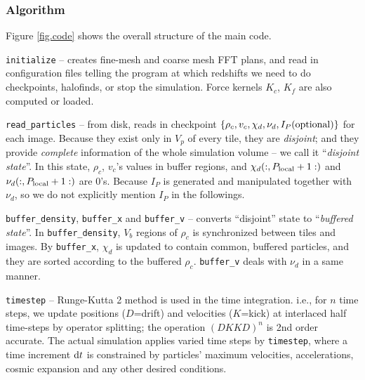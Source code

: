 \documentclass[10pt,twocolumn,preprint]{emulateapj}
\begin{document}
\subsubsection{Algorithm}\label{sss.algorithm}
Figure \ref{fig.code} shows the overall structure of the main code.

{\tt initialize} -- creates fine-mesh and coarse mesh FFT plans, and read in configuration files telling the program at which redshifts we need to do checkpoints, halofinds, or stop the simulation. Force kernels $K_c$, $K_f$ are also computed or loaded.

{\tt read\_particles} -- from disk, reads in checkpoint $\{\rho_c,v_c,\chi_d,\nu_d,I_P({\rm optional})\}$ for each image. Because they exist only in $V_p$ of every tile, they are {\it disjoint}; and they provide {\it complete} information of the whole simulation volume -- we call it ``{\it disjoint state}''. In this state, $\rho_c$, $v_c$'s values in buffer regions, and $\chi_d(:,P_{\rm local}+1:)$ and $\nu_d(:,P_{\rm local}+1:)$ are 0's. Because $I_P$ is generated and manipulated together with $\nu_d$, so we do not explicitly mention $I_P$ in the followings.

{\tt buffer\_density}, {\tt buffer\_x} and {\tt buffer\_v} -- converts ``disjoint'' state to ``{\it buffered state}''. In {\tt buffer\_density}, $V_b$ regions of $\rho_c$ is synchronized between tiles and images. By {\tt buffer\_x}, $\chi_d$ is updated to contain common, buffered particles, and they are sorted according to the buffered $\rho_c$. {\tt buffer\_v} deals with $\nu_d$ in a same manner.

{\tt timestep} --
Runge-Kutta 2 method is used in the time integration. i.e., for $n$ time steps, we update positions ($D$=drift) and velocities ($K$=kick) at interlaced half time-steps by operator splitting; the operation $(DKKD)^n$ is 2nd order accurate. The actual simulation applies varied time steps by {\tt timestep}, where a time increment ${\rm d}t$ is constrained by particles' maximum velocities, accelerations, cosmic expansion and any other desired conditions.
\end{document}
